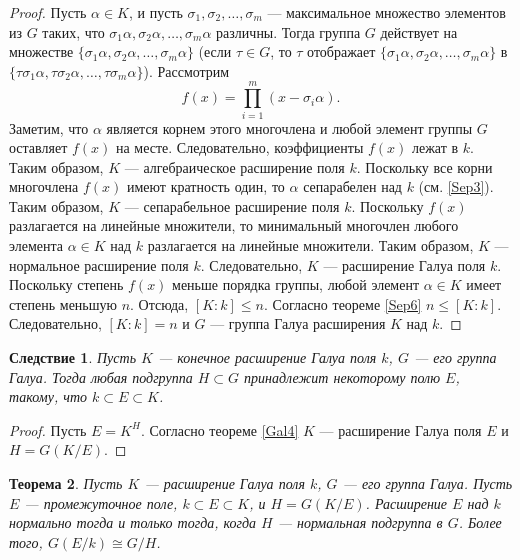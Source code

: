 \documentclass[12pt, titlepage, oneside]{amsbook}
\newtheorem{theorem}{Теорема}[chapter]
\newtheorem{corollary}[theorem]{Следствие}
\theoremstyle{definition}
\theoremstyle{remark}
\begin{document}
\begin{proof}
Пусть $\alpha\in K$, и пусть $\sigma_1, \sigma_2,\ldots,\sigma_m$ --- максимальное множество элементов из $G$ таких, что $\sigma_1\alpha, \sigma_2\alpha,\ldots,\sigma_m\alpha$ различны. Тогда группа $G$ действует на множестве $\{\sigma_1\alpha, \sigma_2\alpha,\ldots,\sigma_m\alpha\}$ (если $\tau\in G$, то $\tau$ отображает $\{\sigma_1\alpha, \sigma_2\alpha,\ldots,\sigma_m\alpha\}$ в $\{\tau\sigma_1\alpha, \tau\sigma_2\alpha,\ldots,\tau\sigma_m\alpha\}$). Рассмотрим $$f(x)=\prod\limits_{i=1}^m(x-\sigma_i\alpha).$$ Заметим, что $\alpha$ является корнем этого многочлена и любой элемент группы $G$ оставляет $f(x)$ на месте. Следовательно, коэффициенты $f(x)$ лежат в $k$. Таким образом, $K$ --- алгебраическое расширение поля $k$. Поскольку все корни многочлена $f(x)$ имеют кратность один, то $\alpha$ сепарабелен над $k$ (см. \ref{Sep3}). Таким образом, $K$ --- сепарабельное расширение поля $k$. Поскольку $f(x)$ разлагается на линейные множители, то минимальный многочлен любого элемента $\alpha\in K$ над $k$ разлагается на линейные множители. Таким образом, $K$ --- нормальное расширение поля $k$. Следовательно,  $K$ --- расширение Галуа поля $k$. Поскольку степень $f(x)$ меньше порядка группы, любой элемент $\alpha\in K$ имеет степень меньшую $n$. Отсюда, $[K:k]\leq n$. Согласно теореме \ref{Sep6} $n\leq[K:k]$. Следовательно, $[K:k]=n$ и $G$ --- группа Галуа расширения $K$ над $k$.
\end{proof}

\begin{corollary}
\label{Gal5}
Пусть $K$ --- конечное расширение Галуа поля $k$, $G$ --- его группа Галуа. Тогда любая подгруппа $H\subset G$ принадлежит некоторому полю $E$, такому, что $k\subset E\subset K$.
\end{corollary}

\begin{proof}
Пусть $E=K^H$. Согласно теореме \ref{Gal4} $K$ --- расширение Галуа поля $E$ и $H=G(K/E)$.
\end{proof}

\begin{theorem}
\label{Gal6}
Пусть $K$ --- расширение Галуа поля $k$, $G$ --- его группа Галуа. Пусть $E$ --- промежуточное поле, $k\subset E\subset K$, и $H=G(K/E)$. Расширение $E$ над $k$ нормально тогда и только тогда, когда $H$ --- нормальная подгруппа в $G$. Более того, $G(E/k)\cong G/H$.
\end{theorem}
\end{document}

